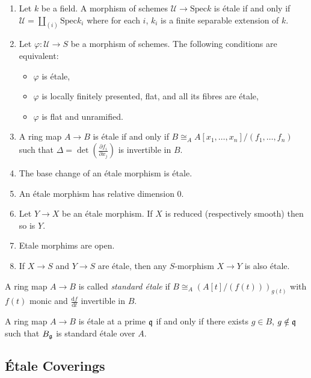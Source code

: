 \begin{proposition} $ $ \label{prop:ofEtaleMorphisms}
\begin{enumerate}
\item
Let $k$ be a field. A morphism of schemes $\mathcal{U} \to \text{Spec} k$ is \'etale if and only if $\mathcal{U} = \coprod_{(i)} \text{Spec} k_i$ where for each $i$, $k_i$ is a finite separable extension of $k$.
\item
Let $\varphi : \mathcal{U} \to S$ be a morphism of schemes. The following conditions are equivalent:  
\begin{itemize}
\item $\varphi$ is \'etale,
\item $\varphi$ is locally finitely presented, flat, and all its fibres are \'etale,
\item $\varphi$ is flat and unramified.
\end{itemize}
\item
A ring map $A \to B$ is \'etale if and only if $B \cong_A A[x_1, \dots,x_n]/(f_1,\dots,f_n)$ such that $\Delta = \det \left( \frac{\partial f_i}{\partial x_j} \right) $ is invertible in $B$.
\item
The base change of an \'etale morphism is \'etale.
\item
An \'etale morphism has relative dimension 0.
\item
Let $Y \to X$ be an \'etale morphism. If  $X$ is reduced (respectively smooth) then so is $Y$.
\item 
Etale morphims are open.
\item
If $X\to S$ and $Y\to S$ are \'etale, then any $S$-morphism $X \to Y$ is also \'etale.
\end{enumerate}
\end{proposition}

\begin{definition}
A ring map $A \to B$ is called \emph{standard \'etale} if $B \cong_A \left( A[t]/(f(t)) \right)_{g(t)}$ with $f(t)$ monic and $\frac{\mathrm{d}f}{\mathrm{d}t}$ invertible in $B$.
\end{definition}

\begin{theorem}
A ring map $A \to B$ is \'etale at a prime $\frak q$ if and only if there exists $g \in B$, $g \notin \frak q$ such that $B_{\frak g}$ is standard \'etale over $A$.
\end{theorem}

\subsection{\'Etale Coverings}

